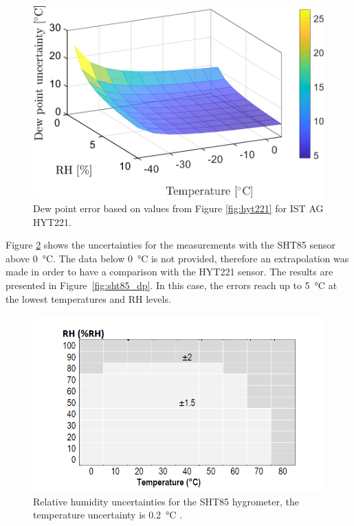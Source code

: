 \begin{figure}[!h]
\centering
\includegraphics[width=0.6\columnwidth]{Chapter5/images/HYT221RH7T15.png}
\caption{Dew point error based on values from Figure \ref{fig:hyt221} for IST AG HYT221.}
\label{fig:hyt221_dp}
\end{figure}
\newpage
Figure \ref{fig:sht85} shows the uncertainties for the measurements with the SHT85 sensor above \SI{0}{\celsius}. The data below \SI{0}{\celsius} is not provided, therefore an extrapolation was made in order to have a comparison with the HYT221 sensor. The results are presented in Figure~\ref{fig:sht85_dp}. In this case, the errors reach up to \SI{5}{\celsius} at the lowest temperatures and \gls{RH} levels.
\begin{figure}[!h]
\centering
\includegraphics[width=0.65\columnwidth]{Chapter5/images/sht85_rh.png}
\caption{Relative humidity uncertainties for the SHT85 hygrometer, the temperature uncertainty is \SI{0.2}{\celsius} \cite{SHT85}.}
\label{fig:sht85}
\end{figure}

